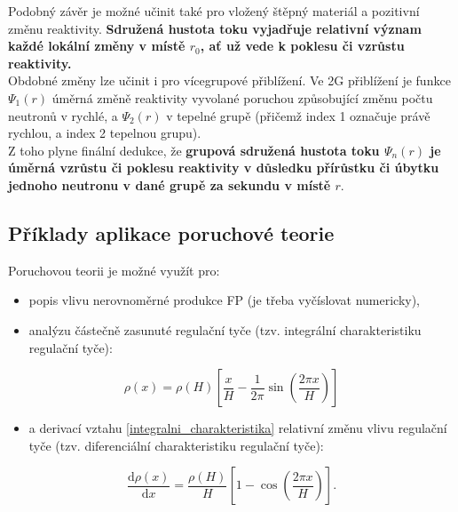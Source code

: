 Podobný závěr je možné učinit také pro vložený štěpný materiál a pozitivní změnu reaktivity. \textbf{Sdružená hustota toku vyjadřuje relativní význam každé lokální změny v místě $r_0$, ať už vede k poklesu či vzrůstu reaktivity.}\\

Obdobné změny lze učinit i pro vícegrupové přiblížení. Ve 2G přiblížení je funkce $\Psi_1(r)$ úměrná změně reaktivity vyvolané poruchou způsobující změnu počtu neutronů v rychlé, a $\Psi_2(r)$ v tepelné grupě (přičemž index 1 označuje právě rychlou, a index 2 tepelnou grupu).\\

Z toho plyne finální dedukce, že \textbf{grupová sdružená hustota toku $\Psi_n(r)$ je úměrná vzrůstu či poklesu reaktivity v důsledku přírůstku či úbytku jednoho neutronu v dané grupě za sekundu v místě $r$}.

\subsection{Příklady aplikace poruchové teorie}

Poruchovou teorii je možné využít pro:

\begin{itemize}
  \item popis vlivu nerovnoměrné produkce FP (je třeba vyčíslovat numericky),
  \item analýzu částečně zasunuté regulační tyče (tzv. integrální charakteristiku regulační tyče):
\end{itemize}

\begin{equation}
  \rho(x) = \rho(H) \left [ \dfrac{x}{H} - \dfrac{1}{2 \pi} \sin \left ( \dfrac{2 \pi x}{H} \right ) \right ]
  \label{integralni_charakteristika}
\end{equation}

\begin{itemize}
  \item a derivací vztahu \eqref{integralni_charakteristika} relativní změnu vlivu regulační tyče (tzv. diferenciální charakteristiku regulační tyče):
\end{itemize}

\begin{equation}
  \dfrac{\text{d}\rho(x)}{\text{d}x} = \dfrac{\rho(H)}{H} \left [ 1 - \cos \left ( \dfrac{2 \pi x}{H} \right ) \right ].
  \label{diferencialni_charakteristika}
\end{equation}
